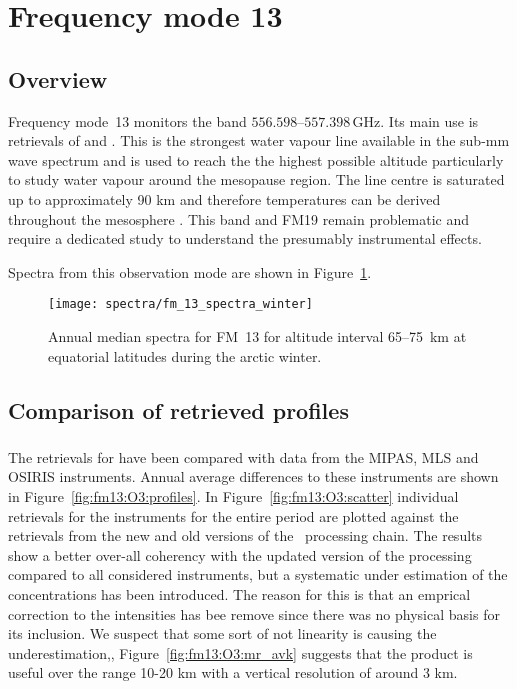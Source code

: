 \section{Frequency mode 13}
\label{sec:fm13}

\subsection{Overview}
\label{sec:fm13:overview}
Frequency mode~13 monitors the band $556.598$--$557.398\,\mathrm{GHz}$. Its
main use is retrievals of  and .
This is the strongest water vapour line available in the sub-mm wave spectrum and is used to reach the the highest possible altitude particularly to study water vapour around the mesopause region.  The line centre is saturated up to approximately 90 km and therefore temperatures can be derived throughout the mesosphere .  This band and FM19 remain problematic and require a dedicated study to understand the presumably instrumental effects.


Spectra from this observation mode are shown in Figure~\ref{fig:spectra:13}.

\begin{figure}[ht]
    \texttt{[image: spectra/fm\_13\_spectra\_winter]}
    \caption{Annual median spectra for FM~13 for altitude interval 65--75~km at
        equatorial latitudes during the arctic winter.
    }\label{fig:spectra:13}
\end{figure}



\subsection{Comparison of retrieved profiles}
\label{sec:fm13:comparison}



\subsubsection{}
\label{sec:fm13:comparison:O3}
The retrievals for  have been compared with data from the MIPAS, MLS
and OSIRIS instruments. Annual average differences to these instruments are
shown in Figure~\ref{fig:fm13:O3:profiles}. In Figure~\ref{fig:fm13:O3:scatter}
individual retrievals for the instruments for the entire period are plotted
against the retrievals from the new and old versions of the \smr\ processing
chain. The results show a better over-all coherency with the updated version
of the processing compared to all considered instruments, but a systematic
under estimation of the concentrations has been introduced.  The reason for this is that an emprical correction to the intensities has bee remove since there was no physical basis for its inclusion. We suspect that some sort of not linearity is causing the underestimation,, 
Figure~\ref{fig:fm13:O3:mr_avk} suggests that the product is useful over the range 10-20 km with a vertical resolution of around 3 km. 



